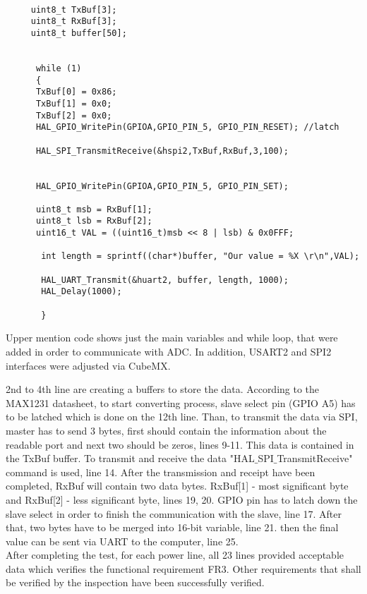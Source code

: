 	
	 \begin{lstlisting}

	 uint8_t TxBuf[3];
	 uint8_t RxBuf[3];
	 uint8_t buffer[50];
	

	  while (1)
	  {
	  TxBuf[0] = 0x86;
	  TxBuf[1] = 0x0;
	  TxBuf[2] = 0x0;
	  HAL_GPIO_WritePin(GPIOA,GPIO_PIN_5, GPIO_PIN_RESET); //latch 
	  
	  HAL_SPI_TransmitReceive(&hspi2,TxBuf,RxBuf,3,100);
	  
	  
	  HAL_GPIO_WritePin(GPIOA,GPIO_PIN_5, GPIO_PIN_SET);
	  
	  uint8_t msb = RxBuf[1];
	  uint8_t lsb = RxBuf[2];
	  uint16_t VAL = ((uint16_t)msb << 8 | lsb) & 0x0FFF;
	  
	   int length = sprintf((char*)buffer, "Our value = %X \r\n",VAL);
	   
	   HAL_UART_Transmit(&huart2, buffer, length, 1000);
	   HAL_Delay(1000);
	   
	   }
	 \end{lstlisting}
	 
	 Upper mention code shows just the main variables and while loop, that were added in order to communicate with ADC. In addition, USART2 and SPI2 interfaces were adjusted via CubeMX.
	 
	 2nd to 4th line are creating a buffers to store the data. According to the MAX1231 datasheet, to start converting process, slave select pin (GPIO A5) has to be latched which is done on the 12th line.
	 Than, to transmit the data via SPI, master has to send 3 bytes, first should contain the information about the readable port and next two should be zeros, lines 9-11. This data is contained in the TxBuf buffer. To transmit and receive the data "HAL$\_$SPI$\_$TransmitReceive" command is used, line 14. After the transmission and receipt have been completed, RxBuf will contain two data bytes.  RxBuf[1] - most significant byte and RxBuf[2] - less significant byte, lines 19, 20. GPIO pin has to latch down the slave select in order to finish the communication with the slave, line 17. After that, two bytes have to be merged into 16-bit variable, line 21. then the final value can be sent via UART to the computer, line 25.\\
	 After completing the test, for each power line, all 23 lines provided acceptable data which verifies the functional requirement FR3. Other requirements that shall be verified by the inspection have been successfully verified.
	 
	 
	 
		